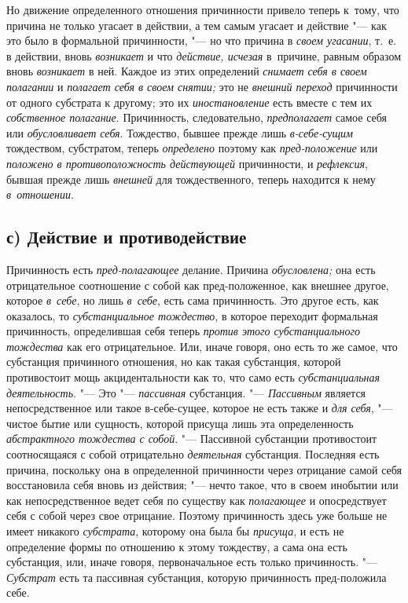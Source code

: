 Но движение определенного отношения причинности привело теперь к~тому, что
причина не только угасает в действии, а тем самым угасает и действие "--- как
это было в формальной причинности, "--- но что причина в {\em своем угасании},
т.~е. в действии, вновь {\em возникает} и что {\em действие, исчезая}
в~причине, равным образом вновь {\em возникает} в ней. Каждое из этих определений
{\em снимает себя в своем полагании} и {\em полагает себя в своем снятии;} это
не {\em внешний переход} причинности от одного субстрата к другому; это их
{\em иностановление} есть вместе с тем их {\em собственное полагание}.
Причинность, следовательно, {\em предполагает} самое себя или
{\em обусловливает себя}. Тождество, бывшее прежде лишь {\em в-себе-сущим}
тождеством, субстратом, теперь {\em определено} поэтому как
{\em пред-положение} или {\em положено в противоположность действующей}
причинности, и {\em рефлексия}, бывшая прежде лишь {\em внешней} для
тождественного, теперь находится к нему {\em в~отношении}.

\subsection[с) Действие и противодействие]{с) Действие и противодействие}

Причинность есть {\em пред-полагающее} делание. Причина {\em обусловлена;} она
есть отрицательное соотношение с собой как пред-положенное, как внешнее другое,
которое {\em в~себе}, но лишь {\em в~себе}, есть сама причинность. Это другое
есть, как оказалось, то {\em субстанциальное тождество}, в которое переходит
формальная причинность, определившая себя теперь {\em против этого
субстанциального тождества} как его отрицательное. Или, иначе говоря, оно есть
то же самое, что субстанция причинного отношения, но как такая субстанция,
которой противостоит мощь акцидентальности как то, что само есть
{\em субстанциальная деятельность}. "--- Это "--- {\em пассивная} субстанция.
"--- {\em Пассивным} является непосредственное или такое в-себе-сущее, которое
не есть также и {\em для себя}, "--- чистое бытие или сущность, которой присуща
лишь эта определенность {\em абстрактного тождества с собой}. "--- Пассивной
субстанции противостоит соотносящаяся с собой отрицательно {\em деятельная}
субстанция. Последняя есть причина, поскольку она в определенной причинности
через отрицание самой себя восстановила себя вновь из действия; "--- нечто
такое, что в своем инобытии или как непосредственное ведет себя по существу как
{\em полагающее} и опосредствует себя с собой через свое отрицание. Поэтому
причинность здесь уже больше не имеет никакого {\em субстрата}, которому она
была бы {\em присуща}, и есть не определение формы по отношению к этому
тождеству, а сама она есть субстанция, или, иначе говоря, первоначальное есть
только причинность. "--- {\em Субстрат} есть та пассивная субстанция, которую
причинность пред-положила себе.

